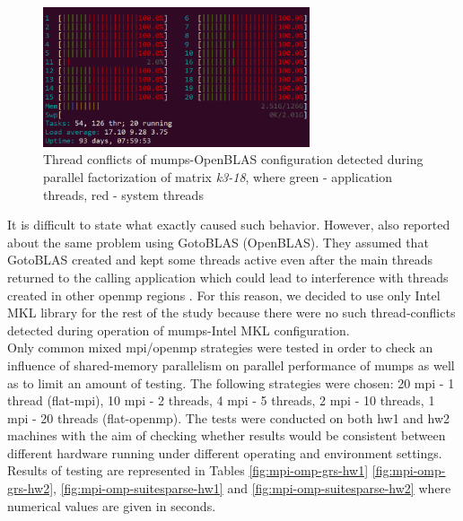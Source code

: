 \begin{figure}[!h]
  \centering
  \includegraphics[width=0.70\textwidth]{figures/chapter-2/openmp-mpi/thread-conflict.png}
\caption[Thread conflicts of \acrshort{mumps}-OpenBLAS configuration detected during parallel factorization of  matrix \textit{k3-18}]{Thread conflicts of \acrshort{mumps}-OpenBLAS configuration detected during parallel factorization of matrix \textit{k3-18}, where green - application threads, red - system threads}
\label{fig:mumps:openblas-thread-conflcit}
\end{figure}


It is difficult to state what exactly caused such behavior. However, \citeauthor{chowdhury2010some} also reported about the same problem using GotoBLAS (OpenBLAS). They assumed that GotoBLAS created and kept some threads active even after the main threads returned to the calling application which could lead to interference with threads created in other \acrshort{openmp} regions \cite{chowdhury2010some}. For this reason, we decided to use only Intel MKL library for the rest of the study because there were no such thread-conflicts detected during operation of \acrshort{mumps}-Intel MKL configuration.\\


Only common mixed \acrshort{mpi}/\acrshort{openmp} strategies were tested in order to check an influence of shared-memory parallelism on parallel performance of \acrshort{mumps} as well as to limit an amount of testing. The following strategies were chosen: 20 \acrshort{mpi} - 1 thread (flat-\acrshort{mpi}), 10 \acrshort{mpi} - 2 threads, 4 \acrshort{mpi} - 5 threads, 2 \acrshort{mpi} - 10 threads, 1 \acrshort{mpi} - 20 threads (flat-\acrshort{openmp}). The tests were conducted on both \gls{hw1} and \gls{hw2} machines with the aim of checking whether  results would be consistent between different hardware running under different operating and environment settings. Results of testing are represented in Tables \ref{fig:mpi-omp-grs-hw1} \ref{fig:mpi-omp-grs-hw2}, \ref{fig:mpi-omp-suitesparse-hw1} and \ref{fig:mpi-omp-suitesparse-hw2} where numerical values are given in seconds.\\


